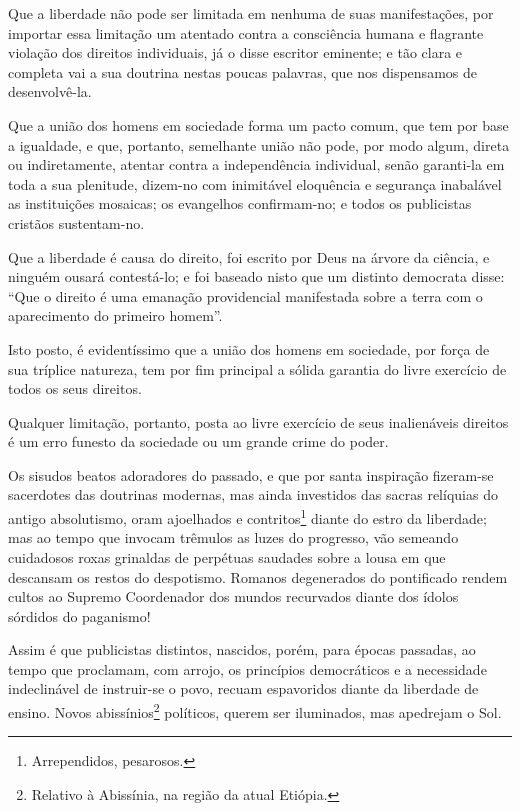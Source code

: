 Que a liberdade não pode ser limitada em nenhuma de suas manifestações,
por importar essa limitação um atentado contra a consciência humana e
flagrante violação dos direitos individuais, já o disse escritor
eminente; e tão clara e completa vai a sua doutrina nestas poucas
palavras, que nos dispensamos de desenvolvê-la.

Que a união dos homens em sociedade forma um pacto comum, que tem por
base a igualdade, e que, portanto, semelhante união não pode, por modo
algum, direta ou indiretamente, atentar contra a independência
individual, senão garanti-la em toda a sua plenitude, dizem-no com
inimitável eloquência e segurança inabalável as instituições mosaicas;
os evangelhos confirmam-no; e todos os publicistas cristãos
sustentam-no.

Que a liberdade é causa do direito, foi escrito por Deus na árvore da
ciência, e ninguém ousará contestá-lo; e foi baseado nisto que um
distinto democrata disse: ``Que o direito é uma emanação providencial
manifestada sobre a terra com o aparecimento do primeiro homem''.

Isto posto, é evidentíssimo que a união dos homens em sociedade, por
força de sua tríplice natureza, tem por fim principal a sólida garantia
do livre exercício de todos os seus direitos.

Qualquer limitação, portanto, posta ao livre exercício de seus
inalienáveis direitos é um erro funesto da sociedade ou um grande crime
do poder.

Os sisudos beatos adoradores do passado, e que por santa inspiração
fizeram-se sacerdotes das doutrinas modernas, mas ainda investidos das
sacras relíquias do antigo absolutismo, oram ajoelhados e
contritos\footnote{Arrependidos, pesarosos.} diante do estro da
liberdade; mas ao tempo que invocam trêmulos as luzes do progresso, vão
semeando cuidadosos roxas grinaldas de perpétuas saudades sobre a lousa
em que descansam os restos do despotismo. Romanos degenerados do
pontificado rendem cultos ao Supremo Coordenador dos mundos recurvados
diante dos ídolos sórdidos do paganismo!

Assim é que publicistas distintos, nascidos, porém, para épocas
passadas, ao tempo que proclamam, com arrojo, os princípios democráticos
e a necessidade indeclinável de instruir-se o povo, recuam espavoridos
diante da liberdade de ensino. Novos abissínios\footnote{Relativo à
  Abissínia, na região da atual Etiópia.} políticos, querem ser
iluminados, mas apedrejam o Sol.

